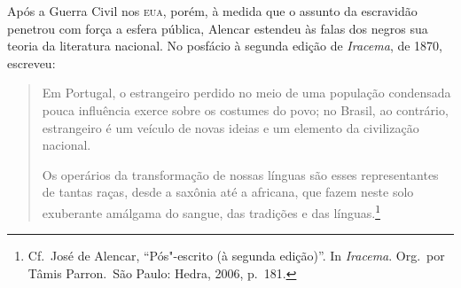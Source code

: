 Após a Guerra Civil nos \textsc{eua}, porém, à  medida que o assunto da
escravidão penetrou com força a esfera pública, Alencar estendeu às
falas dos negros sua teoria da literatura nacional. No posfácio à 
segunda edição de \textit{Iracema}, de 1870, escreveu: 

\begin{quote}
Em Portugal, o estrangeiro perdido no meio de uma população condensada
pouca influência exerce sobre os costumes do povo; no Brasil, ao
contrário, estrangeiro é um veículo de novas ideias e um elemento da
civilização nacional.

Os operários da transformação de nossas línguas são esses representantes
de tantas raças, desde a saxônia até a africana, que fazem neste solo
exuberante amálgama do sangue, das tradições e das línguas.\footnote{ Cf.~José de Alencar, 
``Pós"-escrito (à  segunda edição)''. In
\textit{Iracema}. Org.~por Tâmis Parron.~São Paulo: Hedra, 2006, p.~181.} 
\end{quote}

